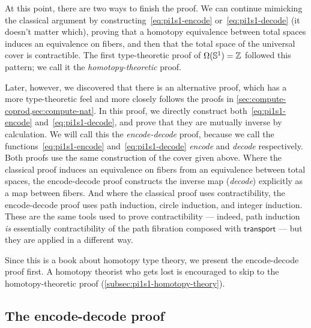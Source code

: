 At this point, there are two ways to finish the proof.
We can continue mimicking the classical argument by constructing~\eqref{eq:pi1s1-encode} or~\eqref{eq:pi1s1-decode} (it doesn't matter which), proving that a homotopy equivalence between total spaces induces an equivalence on fibers, and then that the total space of the universal cover is contractible.
The first type-theoretic proof of $\Omega(\mathbb{S}^1)=\mathbb{Z}$ followed this pattern; we call it the \emph{homotopy-theoretic} proof.

Later, however, we discovered that there is an alternative proof, which has a more type-theoretic feel and more closely follows the proofs in \cref{sec:compute-coprod,sec:compute-nat}.
In this proof, we directly construct both~\eqref{eq:pi1s1-encode} and~\eqref{eq:pi1s1-decode}, and prove that they are mutually inverse by calculation.
We will call this the \emph{encode-decode} proof, because we call the functions~\eqref{eq:pi1s1-encode} and~\eqref{eq:pi1s1-decode} \emph{encode} and \emph{decode} respectively.
Both proofs use the same construction of the cover given above.
Where the classical proof induces an equivalence on fibers from an equivalence between total spaces, the encode-decode proof constructs the inverse map (\emph{decode}) explicitly as a map between fibers.
And where the classical proof uses contractibility, the encode-decode proof uses path induction, circle induction, and integer induction.
These are the same tools used to prove contractibility --- indeed, path induction \emph{is} essentially contractibility of the path fibration composed with $\mathsf{transport}$ --- but they are applied in a different way.

Since this is a book about homotopy type theory, we present the encode-decode proof first.
A homotopy theorist who gets lost is encouraged to skip to the homotopy-theoretic proof (\cref{subsec:pi1s1-homotopy-theory}).

%
%
%

\subsection{The encode-decode proof}
\label{subsec:pi1s1-encode-decode}

